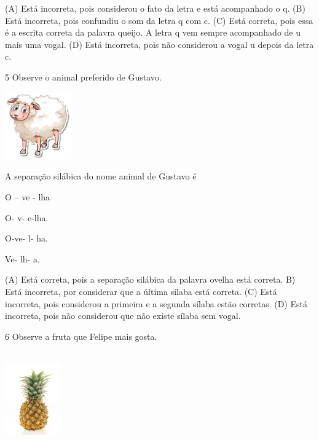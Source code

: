 (A) Está incorreta, pois considerou o fato da letra e está acompanhado o q.
(B) Está incorreta, pois confundiu o som da letra q com c.
(C) Está correta, pois essa é a escrita correta da palavra queijo. A
letra q vem sempre acompanhado de u mais uma vogal.
(D) Está incorreta, pois não considerou a vogal u depois da letra c.

\num{5} Observe o animal preferido de Gustavo.

\includegraphics[width=1.11458in,height=1.13889in]{media/image142.jpeg}


A separação silábica do nome animal de Gustavo é

\begin{minipage}{.5\textwidth}
\begin{escolha}
\item O -- ve - lha

\item O- v- e-lha.

\item O-ve- l- ha.

\item Ve- lh- a.
\end{escolha}
\end{minipage}

(A) Está correta, pois a separação silábica da palavra ovelha está correta.
B) Está incorreta, por considerar que a última sílaba está correta.
(C) Está incorreta, pois considerou a primeira e a segunda sílaba estão corretas.
(D) Está incorreta, pois não considerou que não existe sílaba sem vogal.

\num{6} Observe a fruta que Felipe mais gosta.

\includegraphics[width=0.94236in,height=1.64306in]{media/image143.jpeg}

